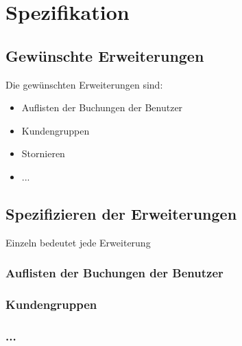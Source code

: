 \chapter{Spezifikation}
\section{Gewünschte Erweiterungen}
Die gewünschten Erweiterungen sind:
\begin{itemize}
	\item Auflisten der Buchungen der Benutzer
	\item Kundengruppen
	\item Stornieren
	\item ...
\end{itemize}

\section{Spezifizieren der Erweiterungen}
Einzeln bedeutet jede Erweiterung
\subsection{Auflisten der Buchungen der Benutzer}
\subsection{Kundengruppen}
\subsection{...}

